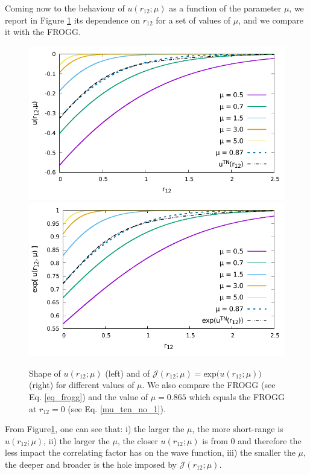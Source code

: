 \documentclass[aip,jcp,reprint,noshowkeys,superscriptaddress]{revtex4-1}
\begin{document}
Coming now to the behaviour of $u(r_{12};\mu)$ as a function of the parameter $\mu$, we report in Figure \ref{fig_j_mu} its dependence on $r_{12}$ for a set of values of $\mu$, and we compare it with the FROGG. 
\begin{figure}
 \label{fig_j_mu}
        \includegraphics[width=0.45\linewidth]{plots/jastrow/small_mu_j.pdf}
        \includegraphics[width=0.45\linewidth]{plots/jastrow/small_mu_exp_j.pdf}\\
        \caption{Shape of $u(r_{12};\mu)$ (left) and of $\mathcal{J}(r_{12};\mu) = \text{exp}\bigg(u(r_{12};\mu) \bigg) $ (right) for different values of $\mu$. 
We also compare the FROGG (see Eq. \eqref{eq_frogg}) and the value of $\mu = 0.865$ which equals the FROGG at $r_{12}=0$ (see Eq. \eqref{mu_ten_no_1}). }
\end{figure}
From Figure\ref{fig_j_mu}, one can see that: i) the larger the $\mu$, the more short-range is $u(r_{12};\mu)$, ii) the larger the $\mu$, the closer $u(r_{12};\mu)$ is from 0 and therefore the less impact the correlating factor has on the wave function, iii) the smaller the $\mu$, the deeper and broader is the hole imposed by $\mathcal{J}(r_{12};\mu)$. 
\end{document}
